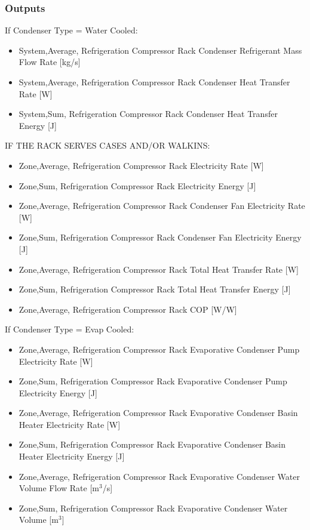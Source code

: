\subsubsection{Outputs}\label{outputs-028}

If Condenser Type = Water Cooled:

\begin{itemize}
\item
  System,Average, Refrigeration Compressor Rack Condenser Refrigerant Mass Flow Rate {[}kg/s{]}
\item
  System,Average, Refrigeration Compressor Rack Condenser Heat Transfer Rate {[}W{]}
\item
  System,Sum, Refrigeration Compressor Rack Condenser Heat Transfer Energy {[}J{]}
\end{itemize}

IF THE RACK SERVES CASES AND/OR WALKINS:

\begin{itemize}
\item
  Zone,Average, Refrigeration Compressor Rack Electricity Rate {[}W{]}
\item
  Zone,Sum, Refrigeration Compressor Rack Electricity Energy {[}J{]}
\item
  Zone,Average, Refrigeration Compressor Rack Condenser Fan Electricity Rate {[}W{]}
\item
  Zone,Sum, Refrigeration Compressor Rack Condenser Fan Electricity Energy {[}J{]}
\item
  Zone,Average, Refrigeration Compressor Rack Total Heat Transfer Rate {[}W{]}
\item
  Zone,Sum, Refrigeration Compressor Rack Total Heat Transfer Energy {[}J{]}
\item
  Zone,Average, Refrigeration Compressor Rack COP {[}W/W{]}
\end{itemize}

If Condenser Type = Evap Cooled:

\begin{itemize}
\item
  Zone,Average, Refrigeration Compressor Rack Evaporative Condenser Pump Electricity Rate {[}W{]}
\item
  Zone,Sum, Refrigeration Compressor Rack Evaporative Condenser Pump Electricity Energy {[}J{]}
\item
  Zone,Average, Refrigeration Compressor Rack Evaporative Condenser Basin Heater Electricity Rate {[}W{]}
\item
  Zone,Sum, Refrigeration Compressor Rack Evaporative Condenser Basin Heater Electricity Energy {[}J{]}
\item
  Zone,Average, Refrigeration Compressor Rack Evaporative Condenser Water Volume Flow Rate {[}m\(^{3}\)/s{]}
\item
  Zone,Sum, Refrigeration Compressor Rack Evaporative Condenser Water Volume {[}m\(^{3}\){]}
\end{itemize}

